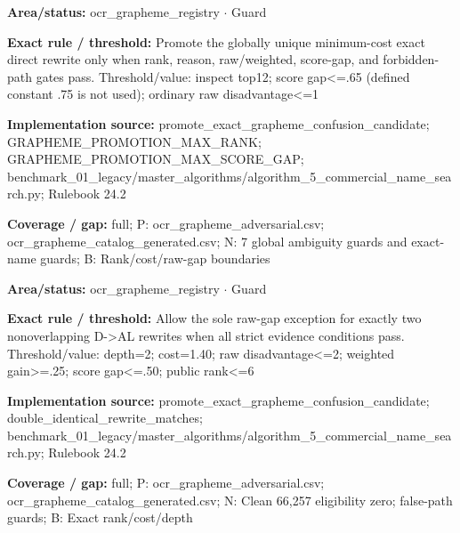 \begin{tcolorbox}[enhanced,breakable,colback=white,colframe=Muted!45,boxrule=0.45pt,arc=1.5pt,left=6pt,right=6pt,top=5pt,bottom=5pt,title={\texttt{OCR-DIRECT-PROMOTION-16}},title after break={\texttt{OCR-DIRECT-PROMOTION-16}\ (continued)},fonttitle=\headingfont\bfseries\color{Navy},coltitle=Navy]
\textbf{Area/status:} ocr\_\allowbreak{}grapheme\_\allowbreak{}registry $\boldsymbol{\cdot}$ Guard\par
\smallskip
\textbf{Exact rule / threshold:} Promote the globally unique minimum-cost exact direct rewrite only when rank, reason, raw/\allowbreak{}weighted, score-gap, and forbidden-path gates pass. Threshold/\allowbreak{}value: inspect top12; score gap<=.65 (defined constant .75 is not used); ordinary raw disadvantage<=1\par
\smallskip
\textbf{Implementation source:} promote\_\allowbreak{}exact\_\allowbreak{}grapheme\_\allowbreak{}confusion\_\allowbreak{}candidate; GRAPHEME\_\allowbreak{}PROMOTION\_\allowbreak{}MAX\_\allowbreak{}RANK; GRAPHEME\_\allowbreak{}PROMOTION\_\allowbreak{}MAX\_\allowbreak{}SCORE\_\allowbreak{}GAP; benchmark\_\allowbreak{}01\_\allowbreak{}legacy/\allowbreak{}master\_\allowbreak{}algorithms/\allowbreak{}algorithm\_\allowbreak{}5\_\allowbreak{}commercial\_\allowbreak{}name\_\allowbreak{}search.py; Rulebook 24.2\par
\smallskip
\textbf{Coverage / gap:} full; P: ocr\_\allowbreak{}grapheme\_\allowbreak{}adversarial.csv; ocr\_\allowbreak{}grapheme\_\allowbreak{}catalog\_\allowbreak{}generated.csv; N: 7 global ambiguity guards and exact-name guards; B: Rank/\allowbreak{}cost/\allowbreak{}raw-gap boundaries
\end{tcolorbox}
\begin{tcolorbox}[enhanced,breakable,colback=white,colframe=Muted!45,boxrule=0.45pt,arc=1.5pt,left=6pt,right=6pt,top=5pt,bottom=5pt,title={\texttt{OCR-DOUBLE-D-AL-17}},title after break={\texttt{OCR-DOUBLE-D-AL-17}\ (continued)},fonttitle=\headingfont\bfseries\color{Navy},coltitle=Navy]
\textbf{Area/status:} ocr\_\allowbreak{}grapheme\_\allowbreak{}registry $\boldsymbol{\cdot}$ Guard\par
\smallskip
\textbf{Exact rule / threshold:} Allow the sole raw-gap exception for exactly two nonoverlapping D->AL rewrites when all strict evidence conditions pass. Threshold/\allowbreak{}value: depth=2; cost=1.40; raw disadvantage<=2; weighted gain>=.25; score gap<=.50; public rank<=6\par
\smallskip
\textbf{Implementation source:} promote\_\allowbreak{}exact\_\allowbreak{}grapheme\_\allowbreak{}confusion\_\allowbreak{}candidate; double\_\allowbreak{}identical\_\allowbreak{}rewrite\_\allowbreak{}matches; benchmark\_\allowbreak{}01\_\allowbreak{}legacy/\allowbreak{}master\_\allowbreak{}algorithms/\allowbreak{}algorithm\_\allowbreak{}5\_\allowbreak{}commercial\_\allowbreak{}name\_\allowbreak{}search.py; Rulebook 24.2\par
\smallskip
\textbf{Coverage / gap:} full; P: ocr\_\allowbreak{}grapheme\_\allowbreak{}adversarial.csv; ocr\_\allowbreak{}grapheme\_\allowbreak{}catalog\_\allowbreak{}generated.csv; N: Clean 66,257 eligibility zero; false-path guards; B: Exact rank/\allowbreak{}cost/\allowbreak{}depth
\end{tcolorbox}

